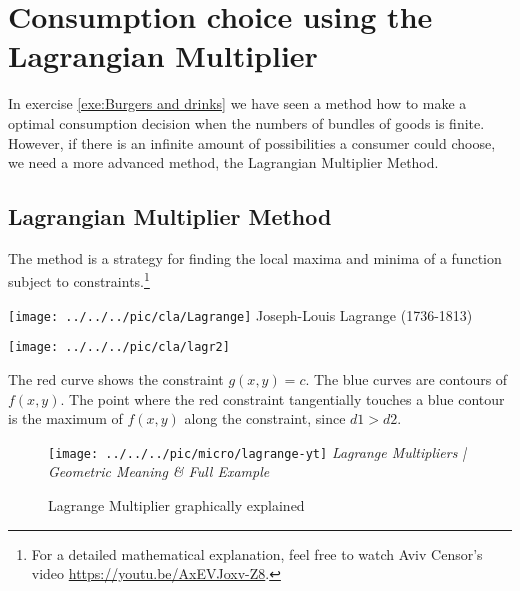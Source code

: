 \section{Consumption choice using the Lagrangian Multiplier}

In exercise \ref{exe:Burgers and drinks} we have seen a method how to make a optimal consumption decision when the numbers of bundles of goods is finite. However, if there is an infinite amount of possibilities a consumer could choose, we need a more advanced method, the Lagrangian Multiplier Method.

\pbn
\subsection{Lagrangian Multiplier Method}
The method is a strategy for finding the local maxima and minima of a function subject to constraints.\footnote{For a detailed mathematical explanation, feel free to watch Aviv Censor's video \websmall\url{https://youtu.be/AxEVJoxv-Z8}.}

\begin{minipage}{0.3\textwidth}
	\begin{center}
		\texttt{[image: ../../../pic/cla/Lagrange]}
		Joseph-Louis Lagrange (1736-1813)
	\end{center}
\end{minipage}
\begin{minipage}{0.7\textwidth}
	\begin{center}
		\texttt{[image: ../../../pic/cla/lagr2]}
	\end{center}
\end{minipage}
The red curve shows the constraint $g(x, y) = c$. The blue curves are contours of $f(x, y)$. The point where the red constraint tangentially touches a blue contour is the maximum of $f(x, y)$ along the constraint, since $d1 > d2$.


\begin{figure}[h]
	\begin{center}
		\texttt{[image: ../../../pic/micro/lagrange-yt]}
		 \textit{Lagrange Multipliers | Geometric Meaning \& Full Example}
	\end{center}
	\caption{Lagrange Multiplier graphically explained}\label{fig:lagrange-yt}
\end{figure}


